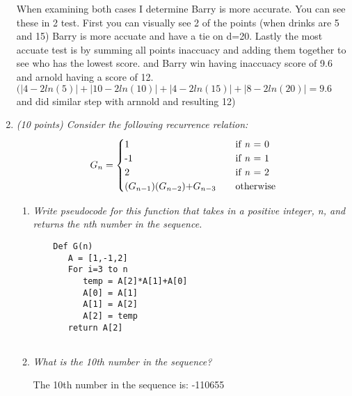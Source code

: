 \documentclass[12pt]{article}
\begin{document}
\begin{enumerate}

When examining both cases I determine Barry is more accurate. You can see these in 2 test. First you can visually see 2 of the points (when drinks are 5 and 15) Barry is more accuate and have a tie on d=20. Lastly the most accuate test is by summing all points inaccuacy and adding them together to see who has the lowest score. and Barry win having inaccuacy score of 9.6 and arnold having a score of 12. $(| 4-2ln(5)|+ |10 - 2ln(10)| + |4 - 2ln(15)| + |8 - 2ln(20)| = 9.6$ and did similar step with arnnold and resulting 12)
    \newpage

 	\item\textit{ (10 points) Consider the following recurrence relation:}
\[
G_n =
     \begin{cases}
       \text{1} &\quad\text{if \textit{n} = 0}\\
       \text{-1} &\quad\text{if \textit{n} = 1}\\
       \text{2} &\quad\text{if \textit{n} = 2}\\
       \text{($G_{n-1}$)($G_{n-2}$)+$G_{n-3}$} &\quad\text{otherwise}\\
     \end{cases}
\]

 	\begin{enumerate}
 	\item\textit{ Write pseudocode for this function that takes in a positive integer, \textit{n}, and returns the \textit{n}th number in the sequence.}

		\begin{verbatim}
	Def G(n) 
	   A = [1,-1,2]
	   For i=3 to n
	      temp = A[2]*A[1]+A[0]
	      A[0] = A[1]
	      A[1] = A[2]
	      A[2] = temp
	   return A[2]
	
	\end{verbatim}
 	\item \textit{What is the 10th number in the sequence?}

	The 10th number in the sequence is: -110655
 	\end{enumerate}


\lhead{ }
\rhead{}
\renewcommand{\headrulewidth}{0pt}

\end{enumerate}
\end{document}
